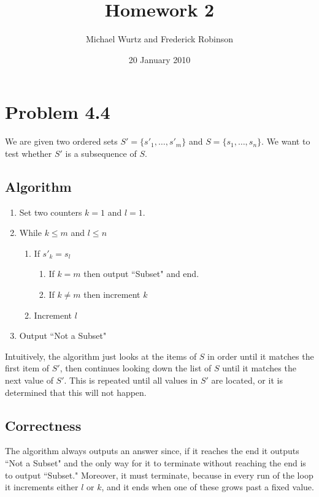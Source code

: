 \documentclass{article}
\title{Homework 2}
\author{Michael Wurtz and Frederick Robinson}
\date{20 January 2010}
\begin{document}

   \maketitle



\section{Problem 4.4}

We are given two ordered sets $S'= \{s'_1,\dots, s'_m\}$ and $S= \{s_1,\dots, s_n\}$. We want to test whether $S'$ is a subsequence of $S$.

\subsection{Algorithm}

\begin{enumerate}
\item Set two counters $k=1$ and $l=1$.
\item While $k \leq m$ and $l \leq n$
\begin{enumerate}
\item If $s'_k = s_l$
\begin{enumerate}
\item If $k = m$ then output ``Subset" and end.
\item If $k \neq m$ then increment $k$
\end{enumerate}
\item Increment $l$
\end{enumerate}
\item Output ``Not a Subset"



\end{enumerate}

Intuitively, the algorithm just looks at the items of $S$ in order until it matches the first item of $S'$, then continues looking down the list of $S$ until it matches the next value of $S'$. This is repeated until all values in $S'$ are located, or it is determined that this will not happen.

\subsection{Correctness}

The algorithm always outputs an answer since, if it reaches the end it outputs ``Not a Subset" and the only way for it to terminate without reaching the end is to output ``Subset." Moreover, it must terminate, because in every run of the loop it increments either $l$ or $k$, and it ends when one of these grows past a fixed value.
\end{document}
